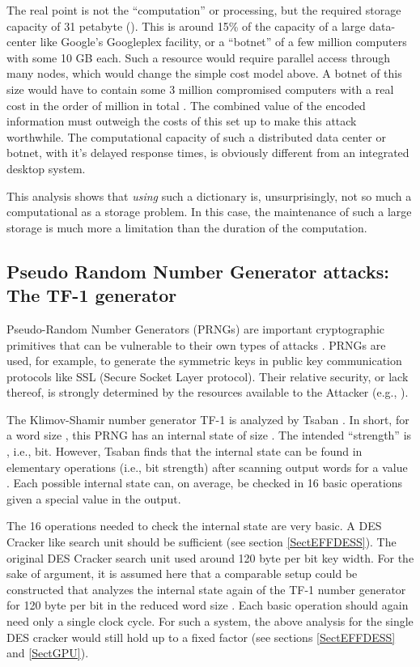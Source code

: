 \documentclass{article}
\begin{document}
The real point is not the
``computation'' or processing, but the required storage capacity of 31 petabyte
(). This is around 15\% of the capacity of a large data-center
like Google's Googleplex facility, or a ``botnet'' of a few million computers
with some 10 GB each.  Such a resource would require parallel access through
many nodes, which would change the simple cost model above.
A botnet of this size would have to contain some 3 million
compromised computers with a real cost in the order of  million in total \cite{Paxsonetal2007-1315292}. 
The combined value of the
encoded information must outweigh the costs of this set up to make this attack
worthwhile. The computational capacity of such a distributed data center or botnet,
with it's delayed response times, is obviously different from an integrated
desktop system.

This analysis shows that \textit{using} such a dictionary is, unsurprisingly, not
so much a computational as a storage problem. In this case, the maintenance of
such a large storage is much more a limitation than the duration of the computation.

\subsection{Pseudo Random Number Generator attacks: The TF-1 generator}

Pseudo-Random Number Generators (PRNGs) are important cryptographic
primitives that can be
vulnerable to their own types of attacks \cite{kelsey98cryptanalytic}.
PRNGs are used, for example, to generate the symmetric keys in public key
communication protocols like SSL (Secure Socket Layer protocol).
Their relative security, or lack thereof, is
strongly determined by the resources available to the Attacker
(e.g., \cite{kelsey98cryptanalytic}).

The Klimov-Shamir number generator TF-1 is analyzed by Tsaban
\cite{tsaban:0507063}. In short, for a word size , this PRNG has an
internal state of size . The intended ``strength'' is 
\cite{KlimovShamir04,tsaban:0507063}, i.e.,  bit. However, Tsaban finds that the internal
state can be found in  elementary operations (i.e.,
 bit strength) after scanning   output words for a  value
\cite{tsaban:0507063}. Each possible internal state can, on average, be checked
in 16 basic operations given a special  value in the output.

The 16 operations needed to check the internal state are very basic. A DES
Cracker like search unit should be sufficient (see section \ref{SectEFFDESS}). 
The original DES Cracker search
unit used around 120 byte per bit key width. For the sake of argument, it is
assumed here that a comparable setup could be constructed that analyzes
the internal state again of the TF-1 number generator for 120 byte per bit in 
the reduced word size . 
Each basic operation should again need only a single clock cycle. For such a
system, the above analysis for the single DES cracker would still hold up to a
fixed factor (see sections \ref{SectEFFDESS} and \ref{SectGPU}).
\end{document}
